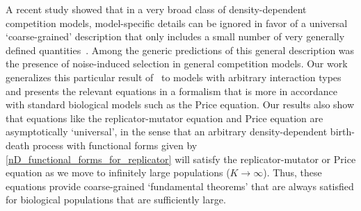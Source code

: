 A recent study showed that in a very broad class of density-dependent competition models, model-specific details can be ignored in favor of a universal `coarse-grained' description that only includes a small number of very generally defined quantities~\citep{mazzolini_universality_2022}. Among the generic predictions of this general description was the presence of noise-induced selection in general competition models. Our work generalizes this particular result of~\cite{mazzolini_universality_2022} to models with arbitrary interaction types and presents the relevant equations in a formalism that is more in accordance with standard biological models such as the Price equation. Our results also show that equations like the replicator-mutator equation and Price equation are asymptotically `universal', in the sense that an arbitrary density-dependent birth-death process with functional forms given by \eqref{nD_functional_forms_for_replicator} will satisfy the replicator-mutator or Price equation as we move to infinitely large populations ($K \to \infty$). Thus, these equations provide coarse-grained `fundamental theorems' that are always satisfied for biological populations that are sufficiently large.

